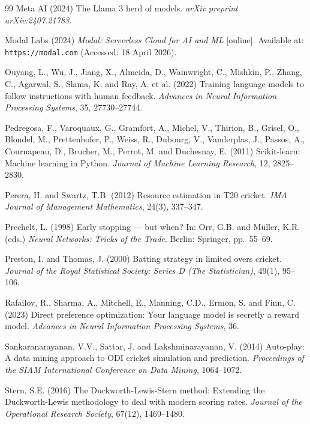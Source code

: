 \documentclass[12pt, oneside]{report}
\begin{document}
\begin{thebibliography}{99}
Meta AI (2024)
The Llama 3 herd of models.
\textit{arXiv preprint arXiv:2407.21783}.

Modal Labs (2024)
\textit{Modal: Serverless Cloud for AI and ML} [online].
Available at: \texttt{https://modal.com} (Accessed: 18 April 2026).

Ouyang, L., Wu, J., Jiang, X., Almeida, D., Wainwright, C., Mishkin, P., Zhang, C., Agarwal, S., Slama, K. and Ray, A. et al. (2022)
Training language models to follow instructions with human feedback.
\textit{Advances in Neural Information Processing Systems}, 35, 27730--27744.

Pedregosa, F., Varoquaux, G., Gramfort, A., Michel, V., Thirion, B., Grisel, O., Blondel, M., Prettenhofer, P., Weiss, R., Dubourg, V., Vanderplas, J., Passos, A., Cournapeau, D., Brucher, M., Perrot, M. and Duchesnay, E. (2011)
Scikit-learn: Machine learning in Python.
\textit{Journal of Machine Learning Research}, 12, 2825--2830.

Perera, H. and Swartz, T.B. (2012)
Resource estimation in T20 cricket.
\textit{IMA Journal of Management Mathematics}, 24(3), 337--347.

Prechelt, L. (1998)
Early stopping --- but when?
In: Orr, G.B. and M\"{u}ller, K.R. (eds.)
\textit{Neural Networks: Tricks of the Trade}. Berlin: Springer, pp.~55--69.

Preston, I. and Thomas, J. (2000)
Batting strategy in limited overs cricket.
\textit{Journal of the Royal Statistical Society: Series D (The Statistician)}, 49(1), 95--106.

Rafailov, R., Sharma, A., Mitchell, E., Manning, C.D., Ermon, S. and Finn, C. (2023)
Direct preference optimization: Your language model is secretly a reward model.
\textit{Advances in Neural Information Processing Systems}, 36.


Sankaranarayanan, V.V., Sattar, J. and Lakshminarayanan, V. (2014)
Auto-play: A data mining approach to ODI cricket simulation and prediction.
\textit{Proceedings of the SIAM International Conference on Data Mining}, 1064--1072.

Stern, S.E. (2016)
The Duckworth-Lewis-Stern method: Extending the Duckworth-Lewis methodology to deal with modern scoring rates.
\textit{Journal of the Operational Research Society}, 67(12), 1469--1480.


\end{thebibliography}
\end{document}
